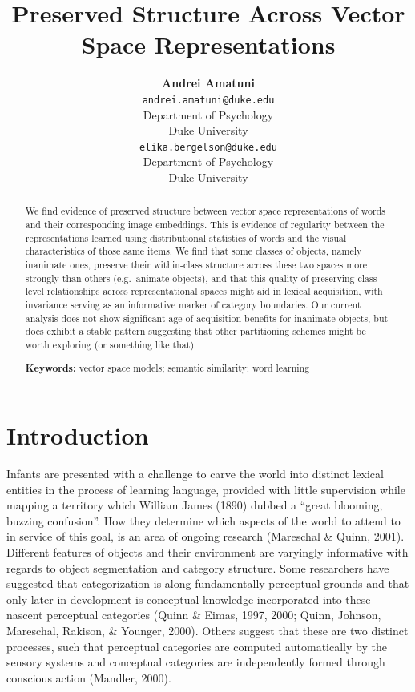 \documentclass[10pt, letterpaper]{article}
\title{Preserved Structure Across Vector Space Representations}
\author{{\large \bf Andrei Amatuni} \\ \texttt{andrei.amatuni@duke.edu} \\ Department of Psychology \\ Duke University \And {\large \bf Elika Bergelson} \\ \texttt{elika.bergelson@duke.edu} \\ Department of Psychology \\ Duke University}
\begin{document}
\maketitle

\begin{abstract}
We find evidence of preserved structure between vector space
representations of words and their corresponding image embeddings. This
is evidence of regularity between the representations learned using
distributional statistics of words and the visual characteristics of
those same items. We find that some classes of objects, namely inanimate
ones, preserve their within-class structure across these two spaces more
strongly than others (e.g.~animate objects), and that this quality of
preserving class-level relationships across representational spaces
might aid in lexical acquisition, with invariance serving as an
informative marker of category boundaries. Our current analysis does not
show significant age-of-acquisition benefits for inanimate objects, but
does exhibit a stable pattern suggesting that other partitioning schemes
might be worth exploring (or something like that)

\textbf{Keywords:}
vector space models; semantic similarity; word learning
\end{abstract}

\section{Introduction}\label{introduction}

Infants are presented with a challenge to carve the world into distinct
lexical entities in the process of learning language, provided with
little supervision while mapping a territory which William James (1890)
dubbed a ``great blooming, buzzing confusion''. How they determine which
aspects of the world to attend to in service of this goal, is an area of
ongoing research (Mareschal \& Quinn, 2001). Different features of
objects and their environment are varyingly informative with regards to
object segmentation and category structure. Some researchers have
suggested that categorization is along fundamentally perceptual grounds
and that only later in development is conceptual knowledge incorporated
into these nascent perceptual categories (Quinn \& Eimas, 1997, 2000;
Quinn, Johnson, Mareschal, Rakison, \& Younger, 2000). Others suggest
that these are two distinct processes, such that perceptual categories
are computed automatically by the sensory systems and conceptual
categories are independently formed through conscious action (Mandler,
2000).
\end{document}
